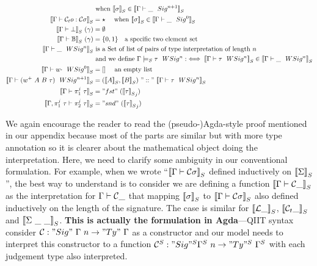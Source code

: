 \begin{align*}
  & \text{ when } \denotesS{\sigma} \in \denotesS{\goodSig{\Gamma}{\_}{n+1}} \\
  \denotesS{\goodTerm{\Gamma}{\cCt o}{\cC\sigma}}
  &= \star \quad \text{ when } \denotesS{\sigma} \in \denotesS{\goodSig{\Gamma}{\_}{0}} \\
  \denotesS{\goodType{\Gamma}{\bot}{i}} \ (\gamma) &= \emptyset \\
  \denotesS{\goodType{\Gamma}{\cB}{i}} \ (\gamma) &= \{0, 1\} \quad \text{a specific two element set} \\
  \denotesS{\goodWSig{\Gamma}{\_}{n}} &\text{ is a Set of list of pairs of type interpretation of length } n \\
  & \text{ and we define } \goodWSigS{\Gamma}{\tau}{n} :\iff \denotesS{\goodWSig{\Gamma}{\tau}{n}} \in \denotesS{\goodWSig{\Gamma}{\_}{n}}\\
  \denotesS{\goodWSig{\Gamma}{w\cdot}{0}} &= [] \quad \text{ an empty list} \\ 
  \denotesS{\goodWSig{\Gamma}{(w^+ \ A \ B \ \tau)}{n+1}}
  &= (\denotesS{A}, \denotesS{B})~"::"~\denotesS{\goodWSig{\Gamma}{\tau}{n}} \\ 
  \denotesS{\goodType{\Gamma}{\pi^j_1~\tau}{}} &= "fst"~({\denotesS{\tau}}_{j})\\
  \denotesS{\goodType{\Gamma, \pi^j_1~\tau}{\pi^j_2~\tau}{}} &= "snd"~({\denotesS{\tau}}_j)\\
\end{align*}


We again encourage the reader to read the (pseudo-)Agda-style proof mentioned in our appendix because most of the parts are similar but with more type annotation so it is clearer about the mathematical object doing the interpretation. Here, we need to clarify some ambiguity in our conventional formulation. For example, when we wrote ``$\denotesS{\goodType{\Gamma}{\cC \sigma}{}}$ defined inductively on $\denotesS{\Sigma}$'', the best way to understand is to consider we are defining a function $\denotesS{\goodType{\Gamma}{\cC \_}{}}$ as the interpretation for $\goodType{\Gamma}{\cC \_}{}$ that mapping $\denotesS{\sigma}$ to $\denotesS{\goodType{\Gamma}{\cC \sigma}{}}$ also defined inductively on the length of the signature. The case is similar for $\denotesS{\cL \_}$, $\denotesS{\cCt \_}$ and  $\denotesS{\Sigma \ \_ \ \_}$. \textbf{This is actually the formulation in Agda}---QIIT syntax consider $\cC : "Sig"~\Gamma~n \to "Ty"~\Gamma$ as a constructor and our model needs to interpret this constructor to a function $\cC^S : "Sig"^S \Gamma^S~n \to "Ty"^S~\Gamma^S$ with each judgement type also interpreted. 

